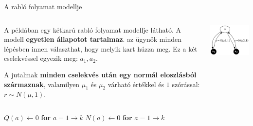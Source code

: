 \documentclass[english, aspectratio=169]{beamer}
\begin{document}
\begin{frame}{A rabló folyamat modellje}
\begin{columns}
\begin{column}{.5\textwidth}
A példában egy kétkarú rabló folyamat modellje látható. A modell \textbf{egyetlen állapotot tartalmaz}. az ügynök minden lépésben innen választhat, hogy melyik kart húzza meg. Ez a két cselekvéssel egyezik meg: $a_{1}, a_{2}$.\par\smallskip
A jutalmak \textbf{minden cselekvés után egy normál eloszlásból származnak}, valamilyen $\mu_{1}$ és $\mu_{2}$ várható értékkel és $1$ szórással: $r\sim N(\mu,1)$.
\end{column}
\begin{column}{.5\textwidth}
\begin{center}
\includegraphics[width=7cm, keepaspectratio]{graphs/solving_0.png}
\end{center}
\end{column}
\end{columns}
\end{frame}

\begin{frame}
\begin{algorithm}[H]
\caption{Rabló játék}
\SetAlgoLined
	$Q(a)\leftarrow0$ \textbf{for} $a=1\rightarrow k$
	$N(a)\leftarrow	0$ \textbf{for} $a=1\rightarrow k$
\end{algorithm}
\end{frame}
\end{document}
